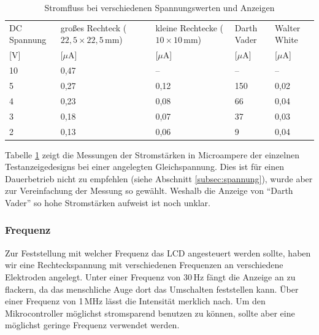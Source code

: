 \begin{table}[]
	\centering
	\caption{Stromfluss bei verschiedenen Spannungswerten und Anzeigen}
	\label{my-label}
	\begin{tabular}{p{1.2cm}|p{1.2cm}|p{1.2cm}|p{1.2cm}|p{1.2cm}}
		DC Spannung & großes Rechteck (\(22,5\times22,5\,\textrm{mm}\)) & kleine Rechtecke (\(10\times10\,\textrm{mm}\)) & Darth Vader & Walter White    \\
        {[}V{]} & {[}$\mu$A{]} & {[}$\mu$A{]} & {[}$\mu$A{]} & {[}$\mu$A{]} \\
         \hline
		10 & 0,47 & -- & --  & --   \\ \hline
		5  & 0,27 & 0,12 & 150 & 0,02 \\ \hline
		4  & 0,23 & 0,08 & 66  & 0,04 \\ \hline
		3  & 0,18 & 0,07 & 37  & 0,03 \\ \hline
		2  & 0,13 & 0,06 & 9   & 0,04 \\
	\end{tabular}
	\label{tab:volt}
\end{table}

Tabelle \ref{tab:volt} zeigt die Messungen der Stromstärken in Microampere der einzelnen Testanzeigedesigns bei einer angelegten Gleichspannung. Dies ist für einen Dauerbetrieb nicht zu empfehlen (siehe Abschnitt \ref{subsec:spannung}), wurde aber zur Vereinfachung der Messung so gewählt. Weshalb die Anzeige von “Darth Vader” so hohe Stromstärken aufweist ist noch unklar.\\

\subsubsection{Frequenz}
Zur Feststellung mit welcher Frequenz das LCD angesteuert werden sollte, haben wir eine Rechteckspannung mit verschiedenen Frequenzen an verschiedene Elektroden angelegt. Unter einer Frequenz von 30\,Hz fängt die Anzeige an zu flackern, da das menschliche Auge dort das Umschalten feststellen kann. Über einer Frequenz von 1\,MHz lässt die Intensität merklich nach. Um den Mikrocontroller möglichst stromsparend benutzen zu können, sollte aber eine möglichst geringe Frequenz verwendet werden.\\


